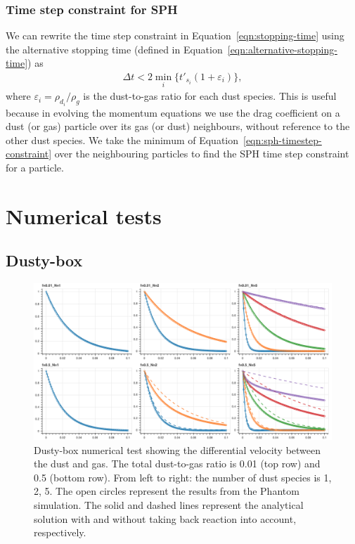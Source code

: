 \documentclass[fleqn,usenatbib]{mnras}
\begin{document}
\subsubsection{Time step constraint for SPH}

We can rewrite the time step constraint in Equation~\ref{eqn:stopping-time}
using the alternative stopping time
(defined in Equation~\ref{eqn:alternative-stopping-time}) as
%
\begin{align}
   \label{eqn:sph-timestep-constraint}
   \Delta t < 2 \min_i \{t'_{s_i} (1 + \varepsilon_i)\},
\end{align}
%
where \(\varepsilon_i = \rho_{d_i} / \rho_g\) is the dust-to-gas ratio for each
dust species. This is useful because in evolving the momentum equations we use
the drag coefficient on a dust (or gas) particle over its gas (or dust)
neighbours, without reference to the other dust species. We take the minimum of
Equation~\ref{eqn:sph-timestep-constraint} over the neighbouring particles to
find the SPH time step constraint for a particle.

\section{Numerical tests}

\subsection{Dusty-box}

\begin{figure}
   \begin{center}
      \includegraphics[width=\textwidth]{figs/dustybox.png}
      \caption{Dusty-box numerical test showing the differential velocity
         between the dust and gas. The total dust-to-gas ratio is 0.01 (top row)
         and 0.5 (bottom row). From left to right: the number of dust species is
         1, 2, 5. The open circles represent the results from the Phantom
         simulation. The solid and dashed lines represent the analytical
         solution with and without taking back reaction into account,
         respectively.\label{fig:dustybox}}
   \end{center}
\end{figure}
\end{document}
